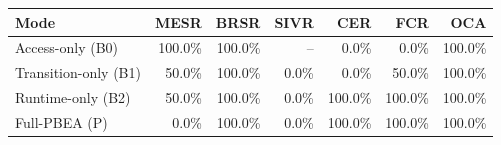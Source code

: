 \begin{tabular}{lrrrrrr}
\toprule
Mode & MESR & BRSR & SIVR & CER & FCR & OCA \\
\midrule
Access-only (B0) & 100.0\% & 100.0\% & -- & 0.0\% & 0.0\% & 100.0\% \\
Transition-only (B1) & 50.0\% & 100.0\% & 0.0\% & 0.0\% & 50.0\% & 100.0\% \\
Runtime-only (B2) & 50.0\% & 100.0\% & 0.0\% & 100.0\% & 100.0\% & 100.0\% \\
Full-PBEA (P) & 0.0\% & 100.0\% & 0.0\% & 100.0\% & 100.0\% & 100.0\% \\
\bottomrule
\end{tabular}
